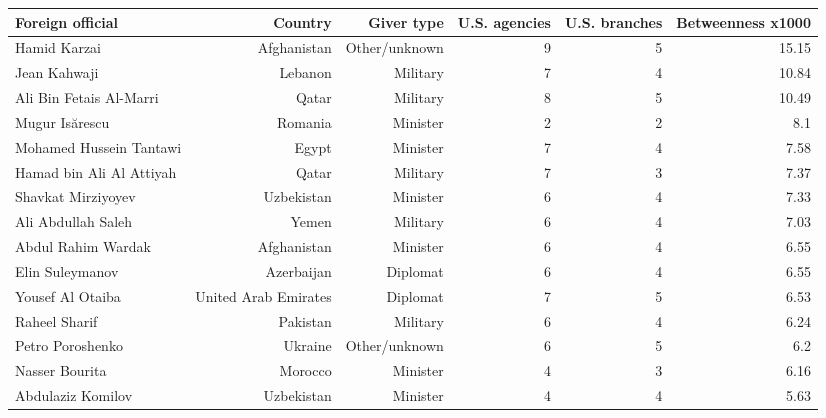 \begin{tabular}{lrrrrr}
\toprule
Foreign official & Country & Giver type & U.S. agencies & U.S. branches & Betweenness x1000 \\
\midrule
Hamid Karzai & Afghanistan & Other/unknown & 9 & 5 & 15.15 \\
Jean Kahwaji & Lebanon & Military & 7 & 4 & 10.84 \\
Ali Bin Fetais Al-Marri & Qatar & Military & 8 & 5 & 10.49 \\
Mugur Isărescu & Romania & Minister & 2 & 2 & 8.1 \\
Mohamed Hussein Tantawi & Egypt & Minister & 7 & 4 & 7.58 \\
Hamad bin Ali Al Attiyah & Qatar & Military & 7 & 3 & 7.37 \\
Shavkat Mirziyoyev & Uzbekistan & Minister & 6 & 4 & 7.33 \\
Ali Abdullah Saleh & Yemen & Military & 6 & 4 & 7.03 \\
Abdul Rahim Wardak & Afghanistan & Minister & 6 & 4 & 6.55 \\
Elin Suleymanov & Azerbaijan & Diplomat & 6 & 4 & 6.55 \\
Yousef Al Otaiba & United Arab Emirates & Diplomat & 7 & 5 & 6.53 \\
Raheel Sharif & Pakistan & Military & 6 & 4 & 6.24 \\
Petro Poroshenko & Ukraine & Other/unknown & 6 & 5 & 6.2 \\
Nasser Bourita & Morocco & Minister & 4 & 3 & 6.16 \\
Abdulaziz Komilov & Uzbekistan & Minister & 4 & 4 & 5.63 \\
\bottomrule
\end{tabular}
\par{}
